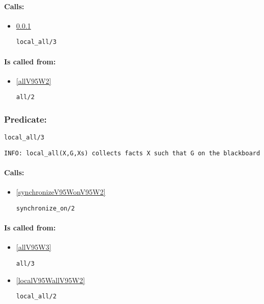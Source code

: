 \paragraph{Calls:} 
\begin{itemize}
\item \ref{localV95WallV95W3} 
\begin{verbatim}
local_all/3
\end{verbatim}

\end{itemize}
\paragraph{Is called from:} 
\begin{itemize}
\item \ref{allV95W2} 
\begin{verbatim}
all/2
\end{verbatim}

\end{itemize}

\subsubsection{Predicate:} \label{localV95WallV95W3}

\begin{verbatim}
local_all/3
\end{verbatim}

{\small \begin{verbatim}
INFO: local_all(X,G,Xs) collects facts X such that G on the blackboard

\end{verbatim}}
\paragraph{Calls:} 
\begin{itemize}
\item \ref{synchronizeV95WonV95W2} 
\begin{verbatim}
synchronize_on/2
\end{verbatim}

\end{itemize}
\paragraph{Is called from:} 
\begin{itemize}
\item \ref{allV95W3} 
\begin{verbatim}
all/3
\end{verbatim}

\item \ref{localV95WallV95W2} 
\begin{verbatim}
local_all/2
\end{verbatim}

\end{itemize}

